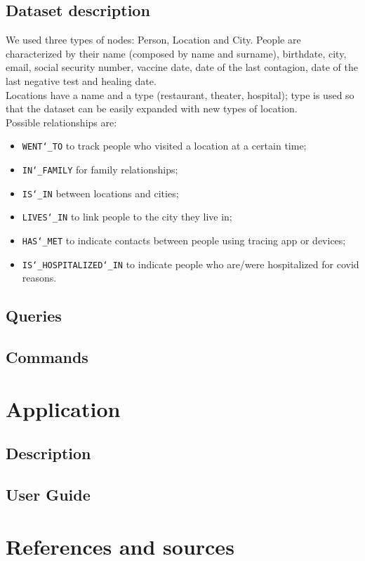 \documentclass[12pt, a4paper]{article}
\begin{document}
\blindtext

\subsection{Dataset description}

We used three types of nodes: Person, Location and City. 
People are characterized by their name (composed by name and surname), 
birthdate, city, email, social security number, vaccine date, date of the last 
contagion, date of the last negative test and healing date. \\
Locations have a name and a type (restaurant, theater, hospital); 
type is used so that the dataset can be easily expanded with new types of 
location. \\
Possible relationships are: 
\begin{itemize}
    \item \texttt{WENT\char`_TO} to track people who visited a location at a 
        certain time;
	\item \texttt{IN\char`_FAMILY} for family relationships;
	\item \texttt{IS\char`_IN} between locations and cities;
	\item \texttt{LIVES\char`_IN} to link people to the city they live in;
    \item \texttt{HAS\char`_MET} to indicate contacts between people using 
        tracing app or devices;
    \item \texttt{IS\char`_HOSPITALIZED\char`_IN} to indicate people who 
        are/were hospitalized for covid reasons.
\end{itemize}

\subsection{Queries}

\blindtext

\subsection{Commands}

\blindtext

\clearpage

\section{Application}

\subsection{Description}

\blindtext

\subsection{User Guide}

\blindtext

\clearpage

\section{References and sources}

\blindtext

\clearpage
\end{document}
